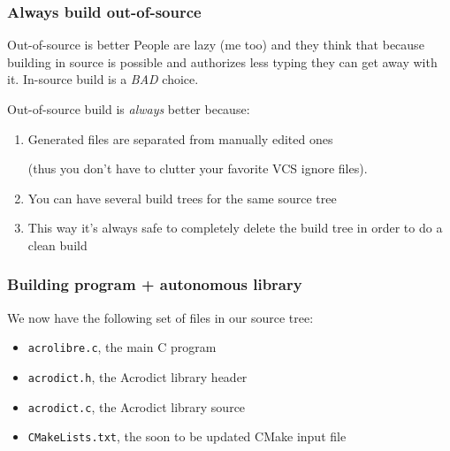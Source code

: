 \documentclass[compress,slidestop,table
              ]
               {beamer}
\newcommand{\fname}[1]{\texttt{#1}}
\begin{document}
\begin{frame}[fragile]
\frametitle{Always build out-of-source}
\begin{alertblock}{Out-of-source is better}
People are lazy (me too) and they think that because
building in source is possible and authorizes less typing
they can get away with it.
In-source build is a \emph{BAD} choice.
\end{alertblock}
Out-of-source build is \emph{always} better because:
\begin{enumerate}
\pause
\item Generated files are separated from manually edited ones

      (thus you don't have to clutter your favorite VCS ignore files).
\pause
\item You can have several build trees for the same source tree
\pause
\item This way it's always safe to completely delete the build tree
      in order to do a clean build
\end{enumerate}
\end{frame}

\begin{frame}[fragile]
\frametitle{Building program + autonomous library}
We now have the following set of files in our source tree:
\begin{itemize}
\item \fname{acrolibre.c}, the main C program
\item \fname{acrodict.h}, the Acrodict library header
\item \fname{acrodict.c}, the Acrodict library source
\item \fname{CMakeLists.txt}, the soon to be updated CMake input file
\end{itemize}
\end{frame}
\end{document}
